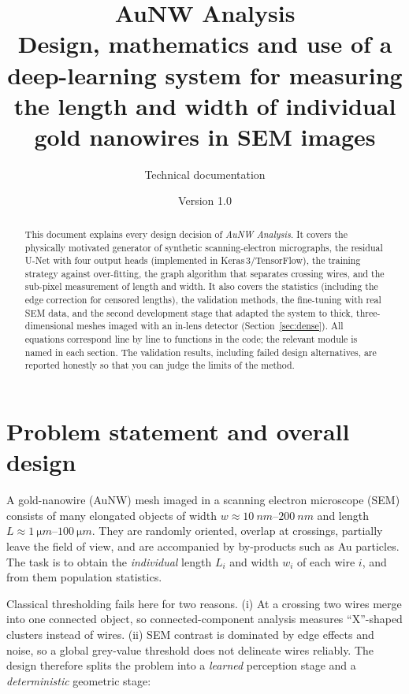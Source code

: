 \documentclass[11pt,a4paper]{article}
\title{\color{navy}\textbf{AuNW Analysis}\\[4pt]
\large Design, mathematics and use of a deep-learning system for measuring\\ the length and width of individual gold nanowires in SEM images}
\author{Technical documentation}
\date{Version 1.0}
\begin{document}
\maketitle
\begin{abstract}
This document explains every design decision of \emph{AuNW Analysis}. It covers the physically motivated generator of synthetic scanning-electron micrographs, the residual U-Net with four output heads (implemented in Keras\,3/TensorFlow), the training strategy against over-fitting, the graph algorithm that separates crossing wires, and the sub-pixel measurement of length and width. It also covers the statistics (including the edge correction for censored lengths), the validation methods, the fine-tuning with real SEM data, and the second development stage that adapted the system to thick, three-dimensional meshes imaged with an in-lens detector (Section~\ref{sec:dense}). All equations correspond line by line to functions in the code; the relevant module is named in each section. The validation results, including failed design alternatives, are reported honestly so that you can judge the limits of the method.
\end{abstract}
\tableofcontents
\newpage

\section{Problem statement and overall design}
A gold-nanowire (AuNW) mesh imaged in a scanning electron microscope (SEM) consists of many elongated objects of width $w\approx\SIrange{10}{200}{nm}$ and length $L\approx\SIrange{1}{100}{\micro m}$. They are randomly oriented, overlap at crossings, partially leave the field of view, and are accompanied by by-products such as Au particles. The task is to obtain the \emph{individual} length $L_i$ and width $w_i$ of each wire $i$, and from them population statistics.

Classical thresholding fails here for two reasons. (i) At a crossing two wires merge into one connected object, so connected-component analysis measures ``X''-shaped clusters instead of wires. (ii) SEM contrast is dominated by edge effects and noise, so a global grey-value threshold does not delineate wires reliably. The design therefore splits the problem into a \emph{learned} perception stage and a \emph{deterministic} geometric stage:
\end{document}
